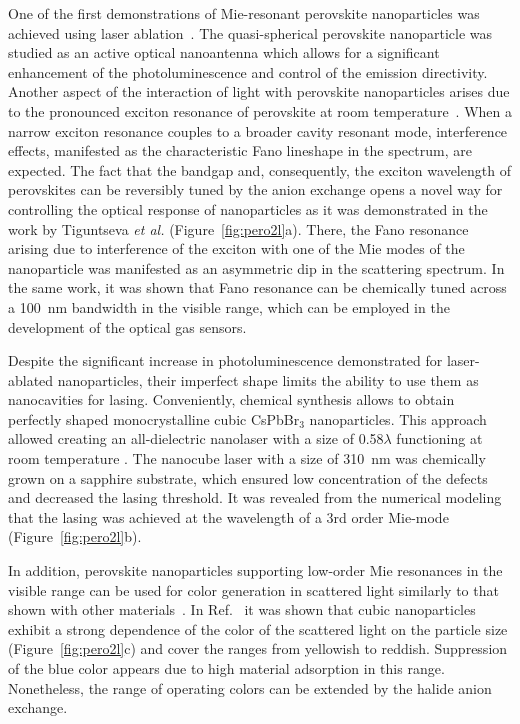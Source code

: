 \documentclass[journal=chreay,manuscript=review]{achemso}
\begin{document}
One of the first demonstrations of Mie-resonant perovskite nanoparticles was achieved using laser ablation~\cite{tiguntseva2018light}. The quasi-spherical perovskite nanoparticle was studied as an active optical nanoantenna which allows for a significant enhancement of the photoluminescence and control of the emission directivity. Another aspect of the interaction of light with perovskite nanoparticles arises due to the pronounced exciton resonance of perovskite at room temperature~\cite{palmieri2020mahan}. When a narrow exciton resonance couples to a broader cavity resonant mode, interference effects, manifested as the characteristic Fano lineshape in the spectrum, are expected. The fact that the bandgap and, consequently, the exciton wavelength of perovskites can be reversibly tuned by the anion exchange opens a novel way for controlling the optical response of nanoparticles as it was demonstrated in the work by Tiguntseva \textit{et al.}\cite{tiguntseva2018tunable} (Figure~\ref{fig:pero2l}a). There, the Fano resonance arising due to interference of the exciton with one of the Mie modes of the nanoparticle was manifested as an asymmetric dip in the scattering spectrum. In the same work, it was shown that Fano resonance can be chemically tuned across a 100~nm bandwidth in the visible range, which can be employed in the development of the optical gas sensors. 

Despite the significant increase in photoluminescence demonstrated for laser-ablated nanoparticles, their imperfect shape limits the ability to use them as nanocavities for lasing. Conveniently, chemical synthesis allows to obtain perfectly shaped monocrystalline cubic CsPbBr$_3$ nanoparticles. This approach allowed creating an all-dielectric nanolaser with a size of 0.58$\lambda$ functioning at room temperature \cite{tiguntseva2020room}. The nanocube laser with a size of 310~nm was chemically grown on a sapphire substrate, which ensured low concentration of the defects and decreased the lasing threshold. It was revealed from the numerical modeling that the lasing was achieved at the wavelength of a 3rd order Mie-mode (Figure~\ref{fig:pero2l}b).

In addition, perovskite nanoparticles supporting low-order Mie resonances in the visible range can be used for color generation in scattered light similarly to that shown with other materials~\cite{kristensen2016plasmonic}. In Ref.~ it was shown that cubic nanoparticles exhibit a strong dependence of the color of the scattered light on the particle size (Figure~\ref{fig:pero2l}c) and cover the ranges from yellowish to reddish. Suppression of the blue color appears due to high material adsorption in this range. Nonetheless, the range of operating colors can be extended by the halide anion exchange.
\end{document}
